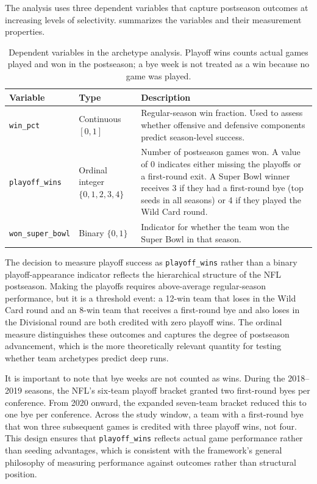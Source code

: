 The analysis uses three dependent variables that capture postseason outcomes
at increasing levels of selectivity.  summarizes the variables
and their measurement properties.

\begin{table}[htbp]
  \centering
  \caption{Dependent variables in the archetype analysis. Playoff wins counts
           actual games played and won in the postseason; a bye week is not
           treated as a win because no game was played.}
  \label{tab:dvs}
  \begin{tabularx}{\textwidth}{llX}
    \toprule
    \textbf{Variable} & \textbf{Type} & \textbf{Description} \\
    \midrule
    \texttt{win\_pct}
      & Continuous $[0, 1]$
      & Regular-season win fraction. Used to assess whether offensive and
        defensive \xvoa{} components predict season-level success. \\[6pt]
    \texttt{playoff\_wins}
      & Ordinal integer $\{0, 1, 2, 3, 4\}$
      & Number of postseason games won. A value of $0$ indicates either
        missing the playoffs or a first-round exit. A Super Bowl winner
        receives 3 if they had a first-round bye (top seeds in all
        seasons) or 4 if they played the Wild Card round. \\[6pt]
    \texttt{won\_super\_bowl}
      & Binary $\{0, 1\}$
      & Indicator for whether the team won the Super Bowl in that
        season. \\
    \bottomrule
  \end{tabularx}
\end{table}

The decision to measure playoff success as \texttt{playoff\_wins} rather than
a binary playoff-appearance indicator reflects the hierarchical structure of
the NFL postseason. Making the playoffs requires above-average regular-season
performance, but it is a threshold event: a 12-win team that loses in the
Wild Card round and an 8-win team that receives a first-round bye and also
loses in the Divisional round are both credited with zero playoff wins. The
ordinal measure distinguishes these outcomes and captures the degree of
postseason advancement, which is the more theoretically relevant quantity for
testing whether team archetypes predict deep runs.

It is important to note that bye weeks are not counted as wins.
During the 2018--2019 seasons, the NFL's six-team playoff bracket granted two
first-round byes per conference. From 2020 onward, the expanded seven-team
bracket reduced this to one bye per conference. Across the study
window, a team with a first-round bye that won three subsequent games is
credited with three playoff wins, not four. This design ensures that
\texttt{playoff\_wins} reflects actual game performance rather than seeding
advantages, which is consistent with the framework's general philosophy of
measuring performance against outcomes rather than structural position.

